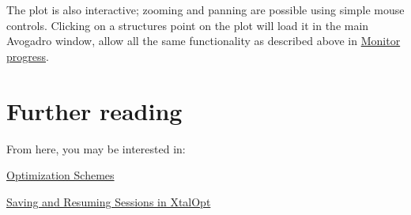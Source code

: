The plot is also interactive; zooming and panning are possible using simple mouse controls. Clicking on a structure\textquotesingle{}s point on the plot will load it in the main Avogadro window, allow all the same functionality as described above in \hyperlink{tut-xo_prog-mon}{Monitor progress}.\hypertarget{tut-xo_xo_tut_further}{}\section{Further reading}\label{tut-xo_xo_tut_further}
From here, you may be interested in\+:
\begin{DoxyItemize}
\item \hyperlink{optschemes}{Optimization Schemes}
\item \hyperlink{xo_saveresume}{Saving and Resuming Sessions in Xtal\+Opt} 
\end{DoxyItemize}